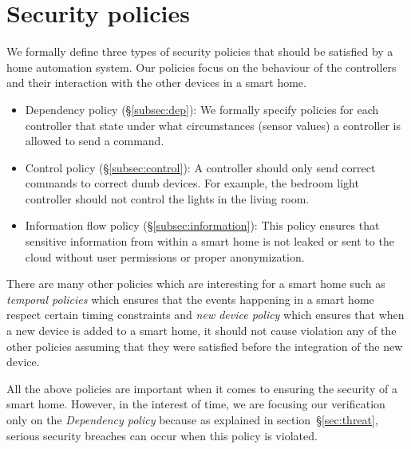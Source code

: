 \documentclass{article}
\begin{document}


\section{Security policies}
\label{sec:policies}
We formally define three types of security policies that should be satisfied by a home automation system. Our policies focus on the behaviour of the controllers and their interaction with the other devices in a smart home. 
\begin{itemize}
\item Dependency policy (\S\ref{subsec:dep}): We formally specify policies for each controller that state under what circumstances (sensor values) a controller is allowed to send a command.

\item Control policy (\S\ref{subsec:control}): A controller should only send correct commands to correct dumb devices. For example, the bedroom light controller should not control the lights in the living room.

\item Information flow policy (\S\ref{subsec:information}): This policy ensures that sensitive information from within a smart home is not leaked or sent to the cloud without user permissions or proper anonymization. 
\end{itemize}
There are many other policies which are interesting for a smart home such as \textit{temporal policies} which ensures that the events happening in a smart home respect certain timing constraints and \textit{new device policy} which ensures that when a new device is added to a smart home, it should not cause violation any of the other policies assuming that they were satisfied before the integration of the new device.

All the above policies are important when it comes to ensuring the security of a smart home. However, in the interest of time, we are focusing our verification only on the \textit{Dependency policy} because as explained in section~\S\ref{sec:threat}, serious security breaches can occur when this policy is violated. 
\end{document}
